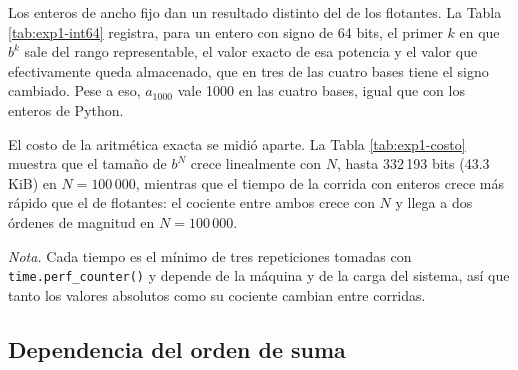 Los enteros de ancho fijo dan un resultado distinto del de los flotantes. La Tabla
\ref{tab:exp1-int64} registra, para un entero con signo de 64 bits, el primer $k$ en que $b^{k}$
sale del rango representable, el valor exacto de esa potencia y el valor que efectivamente queda
almacenado, que en tres de las cuatro bases tiene el signo cambiado. Pese a eso, $a_{1000}$ vale
1000 en las cuatro bases, igual que con los enteros de Python.

\begin{table}[htbp]
  \centering
  \caption{Desborde de los enteros de 64 bits. Para cada base se indica el primer $k$ cuya potencia
  excede el rango de un entero con signo de 64 bits, el valor exacto de $b^{k}$, el valor
  almacenado tras el desborde y el resultado de la suma completa, calculado con la simulación de
  la aritmética de 64 bits y con el entero de precisión arbitraria de Python.}
  \label{tab:exp1-int64}
  
\end{table}

El costo de la aritmética exacta se midió aparte. La Tabla \ref{tab:exp1-costo} muestra que el
tamaño de $b^{N}$ crece linealmente con $N$, hasta 332\,193 bits (43.3 KiB) en $N = 100\,000$,
mientras que el tiempo de la corrida con enteros crece más rápido que el de flotantes: el cociente
entre ambos crece con $N$ y llega a dos órdenes de magnitud en $N = 100\,000$.

\begin{table}[htbp]
  \centering
  \caption{Costo de los enteros de precisión arbitraria con $b = 10$. Se informa el tamaño de la
  última potencia calculada, en bits y en KiB, y el tiempo de la corrida completa con \texttt{int}
  y con \texttt{float}, en milisegundos.}
  \label{tab:exp1-costo}
  

  \vspace{0.5em}
  \begin{minipage}{0.92\textwidth}
    \small \textit{Nota.} Cada tiempo es el mínimo de tres repeticiones tomadas con
    \texttt{time.perf\_counter()} y depende de la máquina y de la carga del sistema, así que tanto
    los valores absolutos como su cociente cambian entre corridas.
  \end{minipage}
\end{table}

\subsection{Dependencia del orden de suma}
\label{subsec:res-orden}


